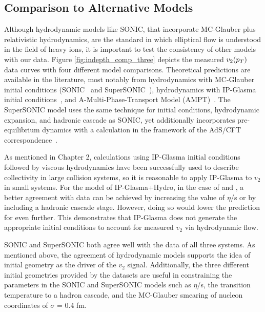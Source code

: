 \subsection{Comparison to Alternative Models}%
Although hydrodynamic models like SONIC, that incorporate MC-Glauber plus relativistic hydrodynamics, are the standard in which elliptical flow is understood in the field of heavy ions, it is important to test the consistency of other models with our data. Figure \ref{fig:indepth_comp_three} depicts the measured $v_2(\mbox{$p_T$})$ data curves with four different model comparisons. Theoretical predictions are available in the literature, most notably from hydrodynamics with MC-Glauber initial conditions (SONIC~\cite{Habich2015} and SuperSONIC~\cite{Romatschke2015}), hydrodynamics with IP-Glasma initial conditions~\cite{Schenke20141039}, and A-Multi-Phase-Transport Model (AMPT)~\cite{PhysRevC.72.064901}. The SuperSONIC model uses the same technique for initial conditions, hydrodynamic expansion, and hadronic cascade as SONIC, yet additionally incorporates pre-equilibrium dynamics with a calculation in the framework of the AdS/CFT correspondence~\cite{PhysRevLett.111.222302}.

As mentioned in Chapter 2, calculations using IP-Glasma initial conditions followed by viscous hydrodynamics have been successfully used to describe collectivity in large collision systems, so it is reasonable to apply IP-Glasma to $v_2$ in small systems. For the model of IP-Glasma+Hydro, in the case of \dau and \hau, a better agreement with data can be achieved by increasing the value of $\eta$/s or by including a hadronic cascade stage. However, doing so would lower the prediction for \pau even further. This demonstrates that IP-Glasma does not generate the appropriate initial conditions to account for measured $v_2$ via hydrodynamic flow.

SONIC and SuperSONIC both agree well with the data of all three systems. As mentioned above, the agreement of hydrodynamic models supports the idea of initial geometry as the driver of the $v_2$ signal. Additionally, the three different initial geometries provided by the datasets are useful in constraining the parameters in the SONIC and SuperSONIC models such as $\eta$/s, the transition temperature to a hadron cascade, and the MC-Glauber smearing of nucleon coordinates of $\sigma$ = 0.4 fm.

